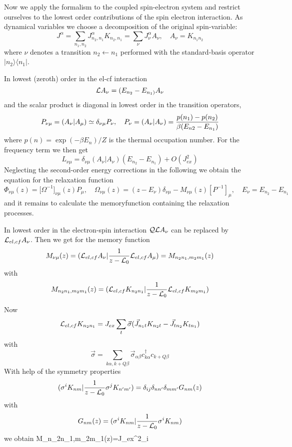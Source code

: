 Now we apply the formalism to the coupled spin-electron system and restrict
ourselves to the lowest order contributions of the spin electron
interaction. As dynamical variables we choose a decomposition of the  
original spin-variable:
$$
J^\alpha=\sum_{n_1,n_2}J^\alpha_{n_2,n_1}K_{n_2,n_1}=\sum_\nu J^\alpha_\nu A_\nu, 
\quad 
A_\nu= K_{n_1n_2}   
$$
where $\nu$ denotes a transition $n_2 \gets n_1$ performed with the
standard-basis operator $\vert n_2\rangle\langle n_1\vert$. 

In lowest (zeroth) order in the el-cf interaction  
$$
{\cal L}A_\nu = (E_{n_2}-E_{n_1)}A_\nu
$$
and  the scalar product is diagonal in lowest order in the transition
operators,
$$
P_{\nu\mu}=(A_\nu\vert A_\mu)\simeq\delta_{\nu
\mu}P_\nu, \quad P_\nu=(A_\nu\vert
A_\nu)={p(n_1)-p(n_2)\over \beta (E_{n2}-E_{n_1})}
$$
where $p(n)=\exp(-\beta E_n)/Z$ is the thermal occupation number. For the
frequency term we then get 
$$
L_{\nu\mu}=\delta_{\nu\mu}(A_\nu\vert A_\nu) (E_{n_2}-E_{n_1} )
+O(J_{ex}^2)
$$
Neglecting the second-order energy corrections in the following we obtain
the equation for the relaxation function 
$$
\Phi_{\nu\mu}(z)=\bigl[\Omega^{-1}\bigr]_{\nu\mu}(z)
P_\mu, \quad
\Omega_{\nu\mu}(z)=(z-E_\nu)\delta_{\nu\mu} -
M_{\nu\mu}(z)[P^{-1}]_\mu, \quad
E_\nu = E_{n_2}- E_{n_1}
$$
and it remains to calculate the memoryfunction containing the relaxation
processes. 

In lowest order in the electron-spin interaction ${\cal QL}A_\nu$ can be replaced by ${\cal L}_{el,cf}A_\nu$.
Then we get for the memory function
$$
M_{\nu \mu}(z)= ({\cal L}_{el,cf}A_\nu \vert{1\over z- {\cal
L}_0}{\cal L}_{el,cf}A_\mu)=
M_{n_2n_1,m_2m_1}(z)
$$
with
$$
M_{n_2n_1,m_2m_1}(z)=({\cal L}_{el,cf} K_{n_2n_1}\vert{1\over z-{\cal
L}_0}{\cal L}_{el,cf} K_{m_2m_1})
$$

Now
$$
{\cal L}_{el,cf} K_{n_2n_1} = J_{ex}\sum_t \vec \sigma(\vec  J_{n_1t}
K_{n_2t} - \vec
J_{tn_2}K_{tn_1})
$$
with
$$
\vec \sigma = \sum_{k\alpha, k+Q\beta}\vec \sigma_{\alpha\beta}
c^\dagger_{k\alpha}c_{k+Q\beta}
$$
With help of the symmetry properties 
$$
( \sigma^i K_{nm}\vert {1\over z- {\cal L}_0}\sigma^j K_{n'm'})=
\delta_{ij}\delta_{nn'}\delta_{mm'}G_{nm}(z)
$$
with
$$
G_{nm}(z)=( \sigma^i K_{nm}\vert {1\over  {z-\cal L}_0}\sigma^i K_{nm})
$$
we obtain
\eqnarray
M_{n_2n_1,m_2m_1}(z)=J_{ex}^2\sum_i\nonumber
\endeqnarray


